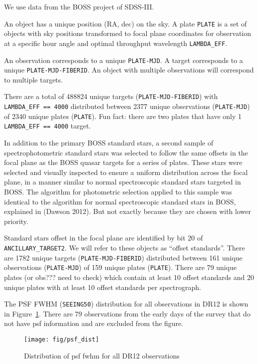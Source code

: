 \documentclass{emulateapj}
\providecommand{\fig}[1]{Figure~\ref{fig:#1}}
\begin{document}
We use data from the BOSS project of SDSS-III.

An object has a unique position (RA, dec) on the sky. A plate \texttt{PLATE} is a set of objects with sky positions transformed to focal plane coordinates for observation at a specific hour angle and optimal throughput wavelength \texttt{LAMBDA\_EFF}. 

An observation corresponds to a unique \texttt{PLATE-MJD}. A target corresponds to a unique \texttt{PLATE-MJD-FIBERID}. An object with multiple observations will correspond to multiple targets.

There are a total of 488824 unique targets (\texttt{PLATE-MJD-FIBERID}) with \texttt{LAMBDA\_EFF == 4000} distributed between 2377 unique observations (\texttt{PLATE-MJD}) of 2340 unique plates (\texttt{PLATE}). Fun fact: there are two plates that have only 1 \texttt{LAMBDA\_EFF == 4000} target.

In addition to the primary BOSS standard stars, a second sample of spectrophotometric standard stars was selected to follow the same offsets in the focal plane as the BOSS quasar targets for a series of plates. These stars were selected and visually inspected to ensure a uniform distribution across the focal plane, in a manner similar to normal spectroscopic standard stars targeted in BOSS. The algorithm for photometric selection applied to this sample was identical to the algorithm for normal spectroscopic standard stars in BOSS, explained in (Dawson 2012). But not exactly because they are chosen with lower priority.

Standard stars offset in the focal plane are identified by bit 20 of \texttt{ANCILLARY\_TARGET2}. We will refer to these objects as ``offset standards''. There are 1782 unique targets (\texttt{PLATE-MJD-FIBERID}) distributed between 161 unique observations (\texttt{PLATE-MJD}) of 159 unique plates (\texttt{PLATE}). There are 79 unique plates (or obs??? need to check) which contain at least 10 offset standards and 20 unique plates with at least 10 offset standards per spectrograph.

The PSF FWHM (\texttt{SEEING50}) distribution for all observations in DR12 is shown in \fig{psf-dist}. There are 79 observations from the early days of the survey that do not have psf information and are excluded from the figure.

\begin{figure}
\centering
\texttt{[image: fig/psf\_dist]}
\caption{Distribution of psf fwhm for all DR12 observations}
\label{fig:psf-dist}
\end{figure}
\end{document}
